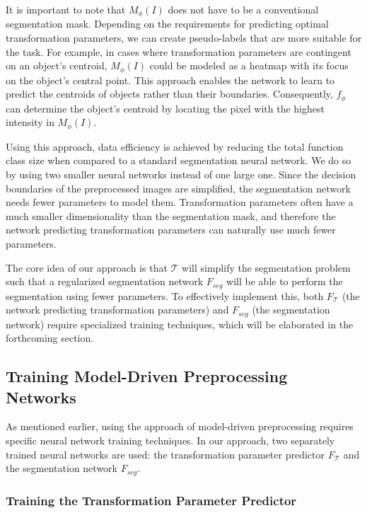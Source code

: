 It is important to note that \( M_\phi(I) \) does not have to be a conventional segmentation mask. Depending on the requirements for predicting optimal transformation parameters, we can create pseudo-labels that are more suitable for the task. For example,
 in cases where transformation parameters are contingent on an object's centroid, \( M_\phi(I) \) could be modeled as a heatmap with its focus on the object's central point. This approach enables the network to learn to predict the centroids of objects rather than their boundaries. Consequently, \( f_\phi \) can determine the object's centroid by locating the pixel with the highest intensity in \( M_\phi(I) \).

Using this approach, data efficiency is achieved by reducing the total function class size when compared to a standard segmentation neural network. We do so by using two smaller neural networks instead of one large one. Since the decision boundaries of the preprocessed images are simplified, the segmentation network needs fewer parameters to model them. Transformation parameters often have a much smaller dimensionality than the segmentation mask, and therefore the network predicting transformation parameters can naturally use much fewer parameters.

The core idea of our approach is that $\mathcal{T}$ will simplify the segmentation problem such that a regularized segmentation network $F_{seg}$ will be able to perform the segmentation using fewer parameters. To effectively implement this, both \(F_{\mathcal{T}}\) (the network predicting transformation parameters) and \(F_{seg}\) (the segmentation network) require specialized training techniques, which will be elaborated in the forthcoming section.

\subsection{Training Model-Driven Preprocessing Networks}

As mentioned earlier, using the approach of model-driven preprocessing requires specific neural network training techniques. In our approach, two separately trained neural networks are used: the transformation parameter predictor $F_{\mathcal{T}}$ and the segmentation network $F_{seg}$. 

\subsubsection{Training the Transformation Parameter Predictor}

